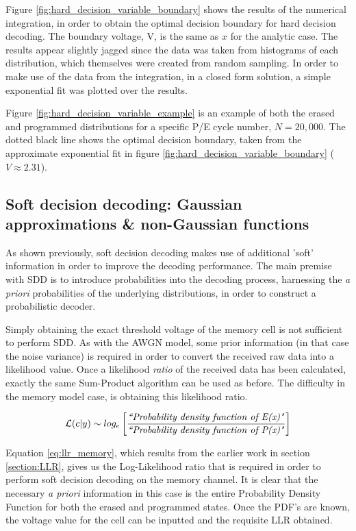 \documentclass[11pt]{article}
\numberwithin{equation}{subsection}
\begin{document}
Figure \ref{fig:hard_decision_variable_boundary} shows the results of the numerical integration, in order to obtain the optimal decision boundary for hard decision decoding. The boundary voltage, V, is the same as $x$ for the analytic case. The results appear slightly jagged since the data was taken from histograms of each distribution, which themselves were created from random sampling. In order to make use of the data from the integration, in a closed form solution, a simple exponential fit was plotted over the results. 

Figure \ref{fig:hard_decision_variable_example} is an example of both the erased and programmed distributions for a specific P/E cycle number, $N=20,000$. The dotted black line shows the optimal decision boundary, taken from the approximate exponential fit in figure \ref{fig:hard_decision_variable_boundary} ($V \approx 2.31$).

\subsection{Soft decision decoding: Gaussian approximations \& non-Gaussian functions}
As shown previously, soft decision decoding makes use of additional 'soft' information in order to improve the decoding performance. The main premise with SDD is to introduce probabilities into the decoding process, harnessing the \textit{a priori} probabilities of the underlying distributions, in order to construct a probabilistic decoder.

Simply obtaining the exact threshold voltage of the memory cell is not sufficient to perform SDD. As with the AWGN model, some prior information (in that case the noise variance) is required in order to convert the received raw data into a likelihood value. Once a likelihood \textit{ratio} of the received data has been calculated, exactly the same Sum-Product algorithm can be used as before. The difficulty in the memory model case, is obtaining this likelihood ratio.

\begin{equation} \label{eq:llr_memory}
\mathcal{L}(c|y) \sim log_e \left[ \dfrac{\text{\textit{``Probability density function of E(x)"}}}{\text{\textit{``Probability density function of P(x)"}}} \right]
\end{equation}

Equation \ref{eq:llr_memory}, which results from the earlier work in section \ref{section:LLR}, gives us the Log-Likelihood ratio that is required in order to perform soft decision decoding on the memory channel. It is clear that the necessary \textit{a priori} information in this case is the entire Probability Density Function for both the erased and programmed states. Once the PDF's are known, the voltage value for the cell can be inputted and the requisite LLR obtained.
\end{document}
